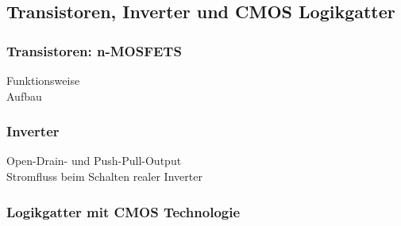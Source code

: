 \subsection{Transistoren, Inverter und CMOS Logikgatter}

\subsubsection{Transistoren: n-MOSFETS}
Funktionsweise\\
Aufbau

\subsubsection{Inverter}
Open-Drain- und Push-Pull-Output\\
Stromfluss beim Schalten realer Inverter

\subsubsection{Logikgatter mit CMOS Technologie}